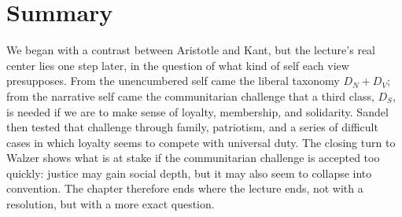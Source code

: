 \section{Summary}

We began with a contrast between Aristotle and Kant, but the lecture's real center lies one step later, in the question of what kind of self each view presupposes. From the unencumbered self came the liberal taxonomy \(D_N + D_V\); from the narrative self came the communitarian challenge that a third class, \(D_S\), is needed if we are to make sense of loyalty, membership, and solidarity. Sandel then tested that challenge through family, patriotism, and a series of difficult cases in which loyalty seems to compete with universal duty. The closing turn to Walzer shows what is at stake if the communitarian challenge is accepted too quickly: justice may gain social depth, but it may also seem to collapse into convention. The chapter therefore ends where the lecture ends, not with a resolution, but with a more exact question.